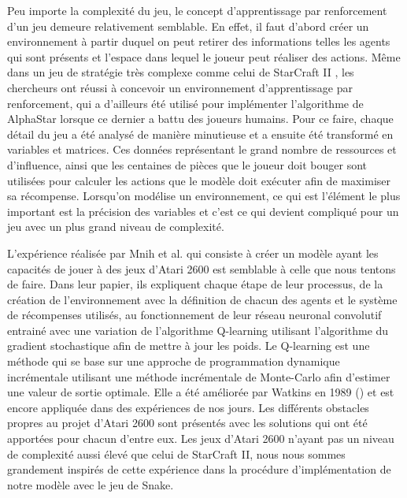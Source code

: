 \documentclass{article}
\begin{document}
Peu importe la complexité du jeu, le concept d'apprentissage par renforcement d'un jeu demeure relativement semblable. En effet, il faut d'abord créer un environnement à partir duquel on peut retirer des informations telles les agents qui sont présents et l'espace dans lequel le joueur peut réaliser des actions. Même dans un jeu de stratégie très complexe comme celui de StarCraft II \cite{DBLP:journals/corr/abs-1708-04782}, les chercheurs ont réussi à concevoir un environnement d'apprentissage par renforcement, qui a d'ailleurs été utilisé pour implémenter l'algorithme de AlphaStar lorsque ce dernier a battu des joueurs humains. Pour ce faire, chaque détail du jeu a été analysé de manière minutieuse et a ensuite été transformé en variables et matrices. Ces données représentant le grand nombre de ressources et d'influence, ainsi que les centaines de pièces que le joueur doit bouger sont utilisées pour calculer les actions que le modèle doit exécuter afin de maximiser sa récompense. Lorsqu'on modélise un environnement, ce qui est l'élément le plus important est la précision des variables et c'est ce qui devient compliqué pour un jeu avec un plus grand niveau de complexité.
\linebreak

L'expérience réalisée par Mnih et al. \cite{DBLP:journals/corr/MnihKSGAWR13} qui consiste à créer un modèle ayant les capacités de jouer à des jeux d'Atari 2600 est semblable à celle que nous tentons de faire. Dans leur papier, ils expliquent chaque étape de leur processus, de la création de l'environnement avec la définition de chacun des agents et le système de récompenses utilisés, au fonctionnement de leur réseau neuronal convolutif entrainé avec une variation de l'algorithme Q-learning utilisant l'algorithme du gradient stochastique afin de mettre à jour les poids. Le Q-learning est une méthode qui se base sur une approche de programmation dynamique incrémentale utilisant une méthode incrémentale de Monte-Carlo afin d'estimer une valeur de sortie optimale. Elle a été améliorée par Watkins en 1989 (\cite{article}) et est encore appliquée dans des expériences de nos jours. Les différents obstacles propres au projet d'Atari 2600 sont présentés avec les solutions qui ont été apportées pour chacun d'entre eux. Les jeux d'Atari 2600 n'ayant pas un niveau de complexité aussi élevé que celui de StarCraft II, nous nous sommes grandement inspirés de cette expérience dans la procédure d'implémentation de notre modèle avec le jeu de Snake.
\end{document}

